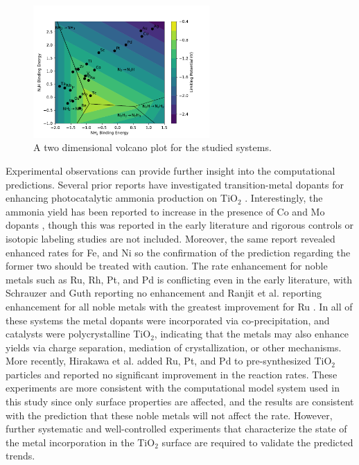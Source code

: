 \begin{figure}
    \centering
    \includegraphics[width=0.6\textwidth]{Images/2d_scaling_plot.pdf}
    \caption{A two dimensional volcano plot for the studied systems.}
    \label{fig:2d_plot}
\end{figure}

Experimental observations can provide further insight into the computational predictions. Several prior reports have investigated transition-metal dopants for enhancing photocatalytic ammonia production on TiO$_2$ \cite{Schrauzer_1977, Ranjit_1996, Hirakawa_2017}. Interestingly, the ammonia yield has been reported to increase in the presence of Co and Mo dopants \cite{Schrauzer_1977}, though this was reported in the early literature and rigorous controls \cite{Greenlee_2018} or isotopic labeling studies \cite{Andersen_2019} are not included. Moreover, the same report revealed enhanced rates for Fe, and Ni so the confirmation of the prediction regarding the former two should be treated with caution. The rate enhancement for noble metals such as Ru, Rh, Pt, and Pd is conflicting even in the early literature, with Schrauzer and Guth reporting no enhancement \cite{Schrauzer_1977} and Ranjit et al. reporting enhancement for all noble metals with the greatest improvement for Ru \cite{Ranjit_1996}. In all of these systems the metal dopants were incorporated via co-precipitation, and catalysts were polycrystalline TiO$_2$, indicating that the metals may also enhance yields via charge separation, mediation of crystallization, or other mechanisms\cite{Medford_2017}. More recently, Hirakawa et al. added Ru, Pt, and Pd to pre-synthesized TiO$_2$ particles and reported no significant improvement in the reaction rates\cite{Hirakawa_2017}. These experiments are more consistent with the computational model system used in this study since only surface properties are affected, and the results are consistent with the prediction that these noble metals will not affect the rate. However, further systematic and well-controlled experiments that characterize the state of the metal incorporation in the TiO$_2$ surface are required to validate the predicted trends.



